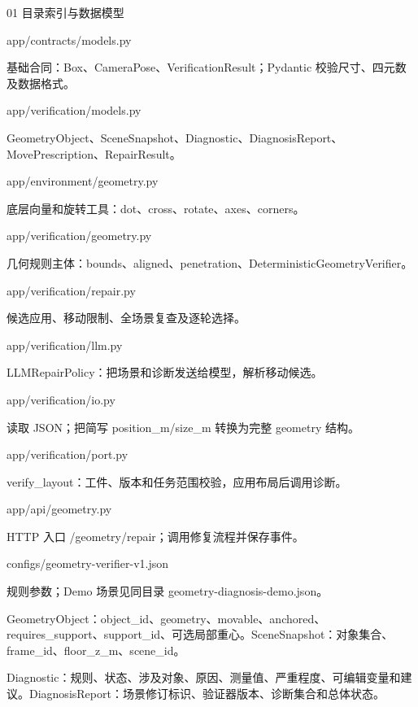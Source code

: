 \documentclass[10pt,a4paper]{article}
\begin{document}
\clearpage
{\color{ink}\LARGE 01 目录索引与数据模型\par}\vspace{5pt}
{\footnotesize\color{ink} app/contracts/models.py\par}
基础合同：Box、CameraPose、VerificationResult；Pydantic 校验尺寸、四元数及数据格式。\par
{\footnotesize\color{ink} app/verification/models.py\par}
GeometryObject、SceneSnapshot、Diagnostic、DiagnosisReport、MovePrescription、RepairResult。\par
{\footnotesize\color{ink} app/environment/geometry.py\par}
底层向量和旋转工具：dot、cross、rotate、axes、corners。\par
{\footnotesize\color{ink} app/verification/geometry.py\par}
几何规则主体：bounds、aligned、penetration、DeterministicGeometryVerifier。\par
{\footnotesize\color{ink} app/verification/repair.py\par}
候选应用、移动限制、全场景复查及逐轮选择。\par
{\footnotesize\color{ink} app/verification/llm.py\par}
LLMRepairPolicy：把场景和诊断发送给模型，解析移动候选。\par
{\footnotesize\color{ink} app/verification/io.py\par}
读取 JSON；把简写 position\_m/size\_m 转换为完整 geometry 结构。\par
{\footnotesize\color{ink} app/verification/port.py\par}
verify\_layout：工件、版本和任务范围校验，应用布局后调用诊断。\par
{\footnotesize\color{ink} app/api/geometry.py\par}
HTTP 入口 /geometry/repair；调用修复流程并保存事件。\par
{\footnotesize\color{ink} configs/geometry-verifier-v1.json\par}
规则参数；Demo 场景见同目录 geometry-diagnosis-demo.json。\par
\par{}
GeometryObject：object\_id、geometry、movable、anchored、requires\_support、support\_id、可选局部重心。SceneSnapshot：对象集合、frame\_id、floor\_z\_m、scene\_id。\par
Diagnostic：规则、状态、涉及对象、原因、测量值、严重程度、可编辑变量和建议。DiagnosisReport：场景修订标识、验证器版本、诊断集合和总体状态。\par
\end{document}

